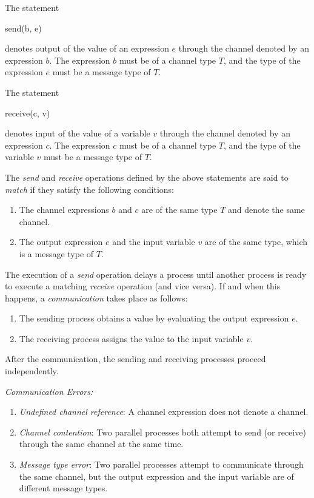 The statement

\begin{center}
  send(b, e)
\end{center}

\noindent
denotes output of the value of an expression $e$ through
the channel denoted by an expression $b$. The expression
$b$ must be of a channel type $T$, and the type of the
expression $e$ must be a message type of $T$.

The statement

\begin{center}
  receive(c, v)
\end{center}

\noindent
denotes input of the value of a variable $v$ through the
channel denoted by an expression $c$. The expression $c$
must be of a channel type $T$, and the type of the variable
$v$ must be a message type of $T$.

The {\it send} and {\it receive} operations defined by the
above statements are said to {\it match} if they satisfy the
following conditions:

\begin{enumerate}
  \item
  The channel expressions $b$ and $c$ are of the same type
  $T$ and denote the same channel.
  \item
  The output expression $e$ and the input variable $v$ are
  of the same type, which is a message type of $T$.
\end{enumerate}

The execution of a {\it send} operation delays a process
until another process is ready to execute a matching {\it
receive} operation (and vice versa). If and when this
happens, a {\it communication} takes place as follows:

\begin{enumerate}
  \item
  The sending process obtains a value by evaluating the
  output expression $e$.
  \item
  The receiving process assigns the value to the input
  variable $v$.
\end{enumerate}

After the communication, the sending and receiving processes
proceed independently.

\blankline

{\it Communication Errors:}

\begin{enumerate}
  \item
  {\it Undefined channel reference}: A channel expression
  does not denote a channel.
  \item
  {\it Channel contention}: Two parallel processes both
  attempt to send (or receive) through the same channel at
  the same time.
  \item
  {\it Message type error}: Two parallel processes attempt
  to communicate through the same channel, but the output
  expression and the input variable are of different message
  types.
\end{enumerate}

